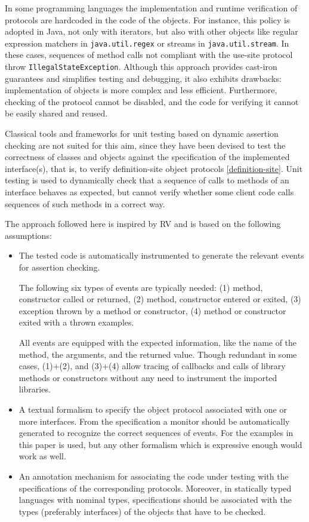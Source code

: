 In some programming languages the implementation and runtime verification of protocols are hardcoded in the code of the objects. For instance, this policy is adopted in Java, not only with iterators, but also with other objects like regular expression matchers in \lstinline|java.util.regex| or streams in \lstinline|java.util.stream|. In these cases, sequences of method calls not compliant with the use-site protocol throw \lstinline|IllegalStateException|.
Although this approach provides cast-iron guarantees and simplifies testing and debugging, it also exhibits drawbacks: implementation of objects is more  complex and less efficient. Furthermore, checking of the protocol cannot be disabled, and the code for verifying it cannot be easily shared and reused.

Classical tools and frameworks for unit testing based on dynamic assertion checking \cite{LangrHT15,FardM17} are not suited for this aim, since they have been devised to test the correctness of classes and objects against the specification of the implemented interface(s), that is, to verify definition-site object protocols \cref{definition-site}. Unit testing is used to dynamically check that a sequence of calls to methods of an interface behaves as expected, but cannot verify whether some client code calls sequences of such methods in a correct way.

The approach followed here is inspired by RV and is based on the following assumptions:
\begin{itemize}
 \item The tested code is automatically instrumented to generate the relevant events for assertion checking.

       The following six types of events are typically needed: (1) method, constructor called or returned, (2) method, constructor entered or exited, (3) exception thrown by a method or constructor, (4) method or constructor exited with a thrown examples.

       All events are equipped with the expected information, like the name of the method, the arguments, and the returned value. Though redundant in some cases, (1)+(2), and (3)+(4) allow tracing of callbacks and calls of library methods or constructors without any need to instrument the imported libraries.
 \item A textual formalism to specify the object protocol associated with one or more interfaces. From the specification a monitor should be automatically generated to recognize the correct sequences of events. For the examples in this paper \rml is used, but any other formalism which is expressive enough would work as well.
 \item An annotation mechanism for associating the code under testing with the specifications of the corresponding protocols. Moreover, in statically typed languages with nominal types, specifications should be associated with the types (preferably interfaces) of the objects that have to be checked.
\end{itemize}

